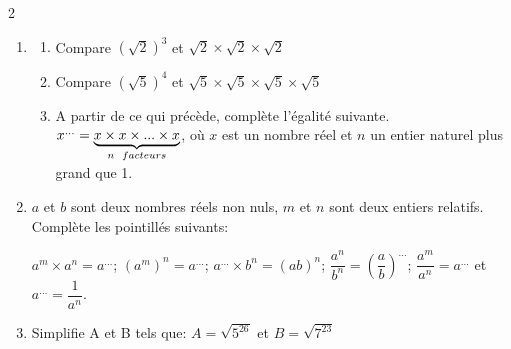 \begin{multicols*}{2}
  	\begin{enumerate}
  		\item 
  		\begin{enumerate}
  			\item  Compare $ \left(\sqrt{2}\right)^3$ et $\sqrt{2}\times \sqrt{2} \times \sqrt{2}$
  			\item  Compare $\left(\sqrt{5}\right)^4$ et $\sqrt{5}\times \sqrt{5} \times \sqrt{5}\times \sqrt{5}$
  			\item A partir de ce qui précède, complète l'égalité suivante.
  			$x^{...}= \underbrace{x\times x\times...\times x}_{n \hspace{0.2cm}facteurs}$, où $x$ est un nombre réel et $n$ un entier naturel plus grand que 1.	
  		\end{enumerate}
  		\item $a$ et $b$ sont deux nombres réels non nuls, $m$ et $n$ sont deux entiers relatifs. Complète les pointillés suivants:	
  		
  		$a^m\times a^n= a^{...}$; $(a^m)^n=a^{...}$; $a^{...}\times b^{n}= (ab)^n$; $\dfrac{a^n}{b^n}= \left(\dfrac{a}{b}\right)^{...}$;  $\dfrac{a^m}{a^n}=a^{...}$ et $a^{...}=\dfrac{1}{a^n}$.
  		\item Simplifie A et B tels que: 
  		$A=\sqrt{5^{26}}$ et $B=\sqrt{7^{23}}$
  	\end{enumerate}	
  	\dures
  	 
  	
  	
\end{multicols*}
